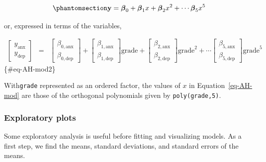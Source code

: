 \documentclass[
  letterpaper,
  10pt,
  krantz2]{krantz}
\begin{document}
\begin{equation}\phantomsection\label{eq-AH-mod}{
\mathbf{y} = \boldsymbol{\beta}_0 + \boldsymbol{\beta}_1 x + \boldsymbol{\beta}_2 x^2 + \cdots \boldsymbol{\beta}_5 x^5
}\end{equation}

or, expressed in terms of the variables,

\begin{eqnarray*}
\begin{bmatrix} y_{\text{anx}} \\y_{\text{dep}} \end{bmatrix} & = &
\begin{bmatrix} \beta_{0,\text{anx}} \\ \beta_{0,\text{dep}} \end{bmatrix} +
\begin{bmatrix} \beta_{1,\text{anx}} \\ \beta_{1,\text{dep}} \end{bmatrix} \text{grade} +
\begin{bmatrix} \beta_{2,\text{anx}} \\ \beta_{2,\text{dep}} \end{bmatrix} \text{grade}^2 + \cdots
\begin{bmatrix} \beta_{5,\text{anx}} \\ \beta_{5,\text{dep}} \end{bmatrix} \text{grade}^5
\end{eqnarray*} \{\#eq-AH-mod2\}

With\texttt{grade} represented as an ordered factor, the values of \(x\)
in Equation~\ref{eq-AH-mod} are those of the orthogonal polynomials
given by \texttt{poly(grade,5)}.

\subsubsection*{Exploratory plots}\label{exploratory-plots-1}

Some exploratory analysis is useful before fitting and visualizing
models. As a first step, we find the means, standard deviations, and
standard errors of the means.
\end{document}
